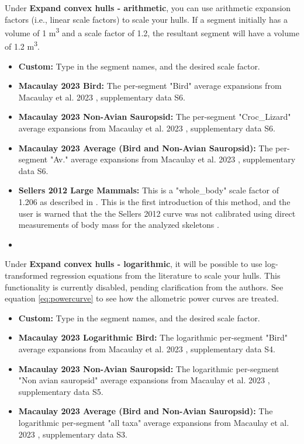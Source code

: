 \documentclass{article}
\begin{document}
Under \textbf{Expand convex hulls - arithmetic}, you can use arithmetic expansion factors (i.e., linear scale factors) to scale your hulls. If a segment initially has a volume of 1 \si{m^3} and a scale factor of 1.2, the resultant segment will have a volume of 1.2 \si{m^3}. 

\begin{itemize}
    \item \textbf{Custom:} Type in the segment names, and the desired scale factor.
    \item \textbf{Macaulay 2023 Bird:} The per-segment "Bird" average expansions from Macaulay et al. 2023 \cite{macaulayDecouplingBodyShape2023}, supplementary data S6.
    \item \textbf{Macaulay 2023 Non-Avian Sauropsid:} The per-segment "Croc\_Lizard" average expansions from Macaulay et al. 2023 \cite{macaulayDecouplingBodyShape2023}, supplementary data S6.
    \item \textbf{Macaulay 2023 Average (Bird and Non-Avian Sauropsid):} The per-segment "Av." average expansions from Macaulay et al. 2023 \cite{macaulayDecouplingBodyShape2023}, supplementary data S6.
    \item \textbf{Sellers 2012 Large Mammals:} This is a "whole\_body" scale factor of 1.206 as described in \cite{sellersMinimumConvexHull2012a}. This is the first introduction of this method, and the user is warned that the the Sellers 2012 curve was not calibrated using direct measurements of body mass for the analyzed skeletons \cite{sellersMinimumConvexHull2012a}.
    \item  
\end{itemize}

Under \textbf{Expand convex hulls - logarithmic}, it will be possible to use log-transformed regression equations from the literature to scale your hulls. This functionality is currently disabled, pending clarification from the authors. See equation \ref{eq:powercurve} to see how the allometric power curves are treated.

\begin{itemize}
    \item \textbf{Custom:} Type in the segment names, and the desired scale factor.
    \item \textbf{Macaulay 2023 Logarithmic Bird:} The logarithmic per-segment "Bird" average expansions from Macaulay et al. 2023 \cite{macaulayDecouplingBodyShape2023}, supplementary data S4.
    \item \textbf{Macaulay 2023 Non-Avian Sauropsid:} The logarithmic per-segment "Non avian sauropsid" average expansions from Macaulay et al. 2023 \cite{macaulayDecouplingBodyShape2023}, supplementary data S5.
    \item \textbf{Macaulay 2023 Average (Bird and Non-Avian Sauropsid):} The logarithmic per-segment "all taxa" average expansions from Macaulay et al. 2023 \cite{macaulayDecouplingBodyShape2023}, supplementary data S3.
\end{itemize}
\end{document}
